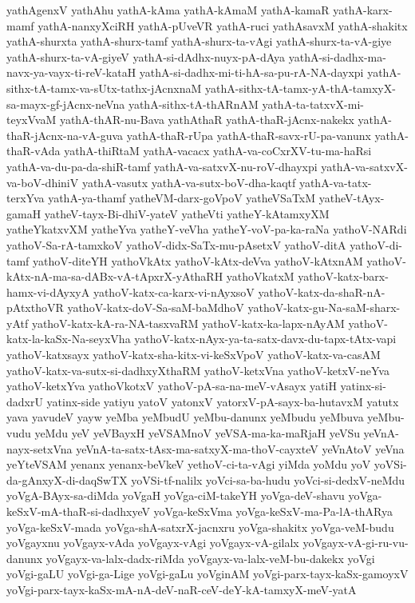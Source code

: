 {yathAgenxV
yathAhu
yathA-kAma
yathA-kAmaM
yathA-kamaR
yathA-karx-mamf
yathA-nanxyXciRH
yathA-pUveVR
yathA-ruci
yathAsavxM
yathA-shakitx
yathA-shurxta
yathA-shurx-tamf
yathA-shurx-ta-vAgi
yathA-shurx-ta-vA-giye
yathA-shurx-ta-vA-giyeV
yathA-si-dAdhx-nuyx-pA-dAya
yathA-si-dadhx-ma-navx-ya-vayx-ti-reV-kataH
yathA-si-dadhx-mi-ti-hA-sa-pu-rA-NA-dayxpi
yathA-sithx-tA-tamx-va-sUtx-tathx-jAcnxnaM
yathA-sithx-tA-tamx-yA-thA-tamxyX-sa-mayx-gf-jAcnx-neVna
yathA-sithx-tA-thARnAM
yathA-ta-tatxvX-mi-teyxVvaM
yathA-thAR-nu-Bava
yathAthaR
yathA-thaR-jAcnx-nakekx
yathA-thaR-jAcnx-na-vA-guva
yathA-thaR-rUpa
yathA-thaR-savx-rU-pa-vanunx
yathA-thaR-vAda
yathA-thiRtaM
yathA-vacacx
yathA-va-coCxrXV-tu-ma-haRsi
yathA-va-du-pa-da-shiR-tamf
yathA-va-satxvX-nu-roV-dhayxpi
yathA-va-satxvX-va-boV-dhiniV
yathA-vasutx
yathA-va-sutx-boV-dha-kaqtf
yathA-va-tatx-terxYva
yathA-ya-thamf
yatheVM-darx-goVpoV
yatheVSaTxM
yatheV-tAyx-gamaH
yatheV-tayx-Bi-dhiV-yateV
yatheVti
yatheY-kAtamxyXM
yatheYkatxvXM
yatheYva
yatheY-veVha
yatheY-voV-pa-ka-raNa
yathoV-NARdi
yathoV-Sa-rA-tamxkoV
yathoV-didx-SaTx-mu-pAsetxV
yathoV-ditA
yathoV-di-tamf
yathoV-diteYH
yathoVkAtx
yathoV-kAtx-deVva
yathoV-kAtxnAM
yathoV-kAtx-nA-ma-sa-dABx-vA-tApxrX-yAthaRH
yathoVkatxM
yathoV-katx-barx-hamx-vi-dAyxyA
yathoV-katx-ca-karx-vi-nAyxsoV
yathoV-katx-da-shaR-nA-pAtxthoVR
yathoV-katx-doV-Sa-saM-baMdhoV
yathoV-katx-gu-Na-saM-sharx-yAtf
yathoV-katx-kA-ra-NA-tasxvaRM
yathoV-katx-ka-lapx-nAyAM
yathoV-katx-la-kaSx-Na-seyxVha
yathoV-katx-nAyx-ya-ta-satx-davx-du-tapx-tAtx-vapi
yathoV-katxsayx
yathoV-katx-sha-kitx-vi-keSxVpoV
yathoV-katx-va-casAM
yathoV-katx-va-sutx-si-dadhxyXthaRM
yathoV-ketxVna
yathoV-ketxV-neYva
yathoV-ketxYva
yathoVkotxV
yathoV-pA-sa-na-meV-vAsayx
yatiH
yatinx-si-dadxrU
yatinx-side
yatiyu
yatoV
yatonxV
yatorxV-pA-sayx-ba-hutavxM
yatutx
yava
yavudeV
yayw
yeMba
yeMbudU
yeMbu-danunx
yeMbudu
yeMbuva
yeMbu-vudu
yeMdu
yeV
yeVBayxH
yeVSAMnoV
yeVSA-ma-ka-maRjaH
yeVSu
yeVnA-nayx-setxVna
yeVnA-ta-satx-tAsx-ma-satxyX-ma-thoV-cayxteV
yeVnAtoV
yeVna
yeYteVSAM
yenanx
yenanx-beVkeV
yethoV-ci-ta-vAgi
yiMda
yoMdu
yoV
yoVSi-da-gAnxyX-di-daqSwTX
yoVSi-tf-nalilx
yoVci-sa-ba-hudu
yoVci-si-dedxV-neMdu
yoVgA-BAyx-sa-diMda
yoVgaH
yoVga-ciM-takeYH
yoVga-deV-shavu
yoVga-keSxV-mA-thaR-si-dadhxyeV
yoVga-keSxVma
yoVga-keSxV-ma-Pa-lA-thARya
yoVga-keSxV-mada
yoVga-shA-satxrX-jacnxru
yoVga-shakitx
yoVga-veM-budu
yoVgayxnu
yoVgayx-vAda
yoVgayx-vAgi
yoVgayx-vA-gilalx
yoVgayx-vA-gi-ru-vu-danunx
yoVgayx-va-lalx-dadx-riMda
yoVgayx-va-lalx-veM-bu-dakekx
yoVgi
yoVgi-gaLU
yoVgi-ga-Lige
yoVgi-gaLu
yoVginAM
yoVgi-parx-tayx-kaSx-gamoyxV
yoVgi-parx-tayx-kaSx-mA-nA-deV-naR-ceV-deY-kA-tamxyX-meV-yatA
}
